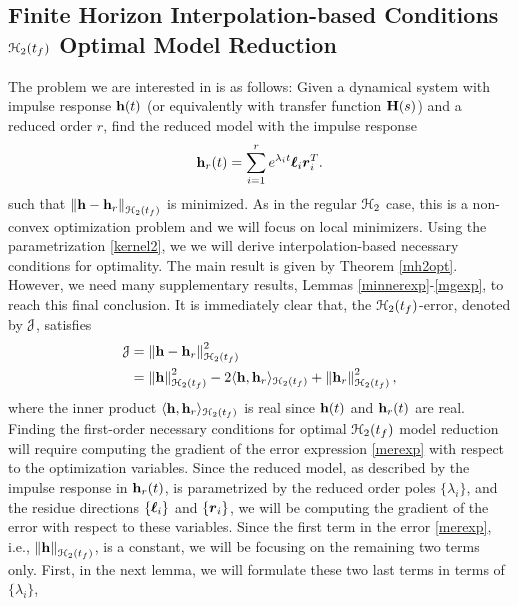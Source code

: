 \documentclass[twocolumn]{autart}
\begin{document}
\subsection{Finite Horizon Interpolation-based Conditions $\EuScript{H}_2(t_f)$ Optimal Model Reduction}
The problem we are interested in is as follows: Given a dynamical system with impulse response $\mathbf{h}(t)$ (or equivalently with transfer function $\mathbf{H}(s)$) and a reduced order $r$, find the reduced model with the impulse response 
\begin{equation}\label{kernel2}
\begin{aligned}
\mathbf{h}_r(t)=\sum_{i=1}^r e^{\lambda_it}\boldsymbol{\ell}_i\boldsymbol{r}_i^T.
\end{aligned}
\end{equation}
such that $\left\lVert\mathbf{h} - \mathbf{h}_r\right\rVert_{\EuScript{H}_2(t_f)}$ is minimized. As in the regular $\EuScript{H}_2$ case, this is a non-convex optimization problem and we will focus on local minimizers. Using the parametrization \eqref{kernel2}, we we will derive interpolation-based necessary conditions for optimality.
The main result is given by Theorem \ref{mh2opt}. However, we  need many supplementary results, Lemmas 
\ref{minnerexp}-\ref{mgexp}, to reach this final conclusion. It is immediately clear that, the $\EuScript{H}_2(t_f)$-error, denoted by $\EuScript{J}$, satisfies 
\begin{equation}\label{merexp}
\begin{aligned}
\EuScript{J}&=\left\lVert\mathbf{h}-\mathbf{h}_r\right\rVert_{\EuScript{H}_2({t_f})}^2\\
&=\left\lVert\mathbf{h}\right\rVert_{\EuScript{H}_2({t_f})}^2-2 \langle\mathbf{h}, \mathbf{h}_r\rangle_{\EuScript{H}_2({t_f})}+\left\lVert\mathbf{h}_r\right\rVert_{\EuScript{H}_2({t_f})}^2,
\end{aligned}
\end{equation}
where the inner product  $\langle\mathbf{h}, \mathbf{h}_r\rangle_{\EuScript{H}_2({t_f})}$ is real since $\mathbf{h}(t)$ and $\mathbf{h}_r(t)$ are real.
Finding the first-order necessary conditions for optimal ${\EuScript{H}_2({t_f})}$ model reduction will require computing the gradient of the error expression \eqref{merexp} with respect to the optimization variables. 
Since the reduced model, as described by  the impulse response in $\mathbf{h}_r(t)$, is parametrized by the 
reduced order poles $\{\lambda_i\}$, and the residue directions $\{\boldsymbol{\ell}_i\}$ and $\{\boldsymbol{r}_i\}$, we will be computing the gradient of the error with respect to these variables. Since the first term in the error \eqref{merexp}, i.e., $\left\lVert\mathbf{h}\right\rVert_{\EuScript{H}_2({t_f})}$, is a constant, we will be focusing on the remaining two terms only. First, in the next lemma, we will formulate these two last terms in terms of $\{\lambda_i\}$, 
\end{document}
